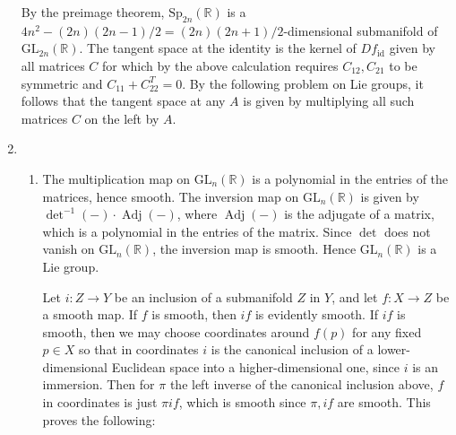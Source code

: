 \documentclass[11pt,leqno]{article}
\theoremstyle{plain}
\theoremstyle{definition}
\numberwithin{equation}{section}
\numberwithin{lem}{section}
\DeclareMathOperator{\id}{id}
\DeclareMathOperator{\Adj}{Adj}
\newcommand{\GL}{\mathrm{GL}}
\newcommand{\Sp}{\mathrm{Sp}}
\begin{document}
\begin{enumerate}
    By the preimage theorem, $\Sp_{2n}(\mathbb R)$ is a $4n^2 - (2n)(2n-1)/2 = (2n)(2n+1)/2$-dimensional submanifold of $\GL_{2n}(\mathbb R)$. The tangent space at the identity is the kernel of $Df_{\id}$ given by all matrices $C$ for which by the above calculation requires $C_{12},C_{21}$ to be symmetric and $C_{11} + C_{22}^T = 0$. By the following problem on Lie groups, it follows that the tangent space at any $A$ is given by multiplying all such matrices $C$ on the left by $A$.
    \item \begin{enumerate}
      \item The multiplication map on $\GL_n(\mathbb R)$ is a polynomial in the entries of the matrices, hence smooth. The inversion map on $\GL_n(\mathbb R)$ is given by $\det^{-1}(-)\cdot\Adj(-)$, where $\Adj(-)$ is the adjugate of a matrix, which is a polynomial in the entries of the matrix. Since $\det$ does not vanish on $\GL_n(\mathbb R)$, the inversion map is smooth. Hence $\GL_n(\mathbb R)$ is a Lie group.
      
      Let $i\colon Z\to Y$ be an inclusion of a submanifold $Z$ in $Y$, and let $f\colon X\to Z$ be a smooth map. If $f$ is smooth, then $if$ is evidently smooth. If $if$ is smooth, then we may choose coordinates around $f(p)$ for any fixed $p\in X$ so that in coordinates $i$ is the canonical inclusion of a lower-dimensional Euclidean space into a higher-dimensional one, since $i$ is an immersion. Then for $\pi $ the left inverse of the canonical inclusion above, $f$ in coordinates is just $\pi i f$, which is smooth since $\pi, if$ are smooth. This proves the following:


\end{enumerate}
\end{enumerate}
\end{document}

